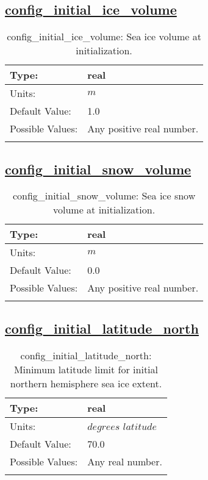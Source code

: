 \subsection[config\_initial\_ice\_volume]{\hyperref[sec:nm_tab_initialize]{config\_initial\_ice\_volume}}
\label{subsec:nm_sec_config_initial_ice_volume}
\begin{center}
\begin{longtable}{| p{2.0in} || p{4.0in} |}
    \hline
    Type: & real \\
    \hline
    Units: & $m$ \\
    \hline
    Default Value: & 1.0 \\
    \hline
    Possible Values: & Any positive real number. \\
    \hline
    \caption{config\_initial\_ice\_volume: Sea ice volume at initialization.}
\end{longtable}
\end{center}
\subsection[config\_initial\_snow\_volume]{\hyperref[sec:nm_tab_initialize]{config\_initial\_snow\_volume}}
\label{subsec:nm_sec_config_initial_snow_volume}
\begin{center}
\begin{longtable}{| p{2.0in} || p{4.0in} |}
    \hline
    Type: & real \\
    \hline
    Units: & $m$ \\
    \hline
    Default Value: & 0.0 \\
    \hline
    Possible Values: & Any positive real number. \\
    \hline
    \caption{config\_initial\_snow\_volume: Sea ice snow volume at initialization.}
\end{longtable}
\end{center}
\subsection[config\_initial\_latitude\_north]{\hyperref[sec:nm_tab_initialize]{config\_initial\_latitude\_north}}
\label{subsec:nm_sec_config_initial_latitude_north}
\begin{center}
\begin{longtable}{| p{2.0in} || p{4.0in} |}
    \hline
    Type: & real \\
    \hline
    Units: & $degrees$ $latitude$ \\
    \hline
    Default Value: & 70.0 \\
    \hline
    Possible Values: & Any real number. \\
    \hline
    \caption{config\_initial\_latitude\_north: Minimum latitude limit for initial northern hemisphere sea ice extent.}
\end{longtable}
\end{center}

